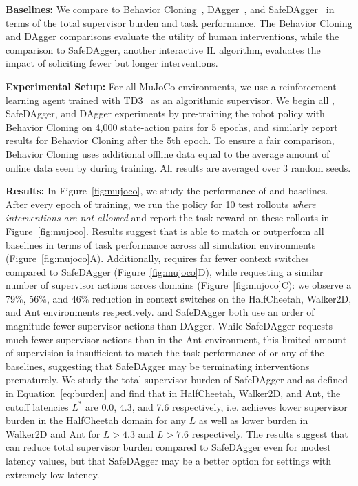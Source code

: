 \textbf{Baselines:}
\label{ssec:baselines}
We compare \algname to Behavior Cloning~\cite{torabi2018behavioral}, DAgger~\cite{dagger}, and SafeDAgger~\cite{safe_dagger} in terms of the total supervisor burden and task performance. The Behavior Cloning and DAgger comparisons evaluate the utility of human interventions, while the comparison to SafeDAgger, another interactive IL algorithm, evaluates the impact of soliciting fewer but longer interventions.

\textbf{Experimental Setup: }For all MuJoCo environments, we use a reinforcement learning agent trained with TD3~\cite{td3} as an algorithmic supervisor. 
We begin all \algabbr, SafeDAgger, and DAgger experiments by pre-training the robot policy with Behavior Cloning on 4,000 state-action pairs for 5 epochs, and similarly report results for Behavior Cloning after the 5th epoch. To ensure a fair comparison, Behavior Cloning uses additional offline data equal to the average amount of online data seen by \algabbr during training. All results are averaged over 3 random seeds.

\textbf{Results: }In Figure~\ref{fig:mujoco}, we study the performance of \algabbr and baselines. After every epoch of training, we run the policy for 10 test rollouts \emph{where interventions are not allowed} and report the task reward on these rollouts in Figure~\ref{fig:mujoco}. Results suggest that \algabbr is able to match or outperform all baselines in terms of task performance across all simulation environments (Figure~\ref{fig:mujoco}A). Additionally, \algabbr requires far fewer context switches compared to SafeDAgger (Figure~\ref{fig:mujoco}D), while requesting a similar number of supervisor actions across domains (Figure~\ref{fig:mujoco}C): we observe a 79\%, 56\%, and 46\% reduction in context switches on the HalfCheetah, Walker2D, and Ant environments respectively. \algname and SafeDAgger both use an order of magnitude fewer supervisor actions than DAgger. While SafeDAgger requests much fewer supervisor actions than \algname in the Ant environment, this limited amount of supervision is insufficient to match the task performance of \algname or any of the baselines, suggesting that SafeDAgger may be terminating interventions prematurely. We study the total supervisor burden of SafeDAgger and \algname as defined in Equation~\eqref{eq:burden} and find that in HalfCheetah, Walker2D, and Ant, the cutoff latencies $L^*$ are 0.0, 4.3, and 7.6 respectively, i.e. \algname achieves lower supervisor burden in the HalfCheetah domain for any $L$ as well as lower burden in Walker2D and Ant for $L > 4.3$ and $L > 7.6$ respectively. The results suggest that \algname can reduce total supervisor burden compared to SafeDAgger even for modest latency values, but that SafeDAgger may be a better option for settings with extremely low latency.

